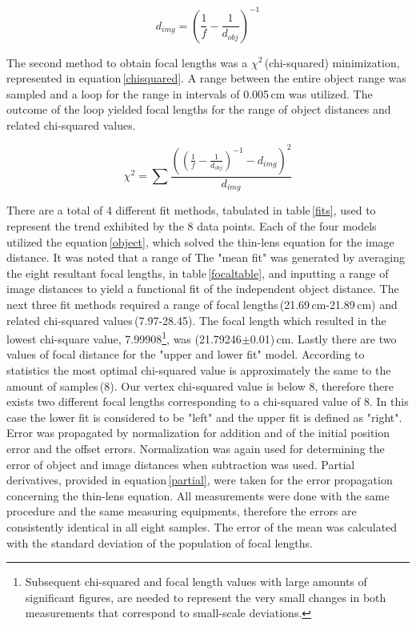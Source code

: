 \documentclass[twocolumn]{aastex6}
\begin{document}
\begin{equation}
d_{img}=\left(\frac{1}{f}-\frac{1}{d_{obj}}\right)^{-1}
\label{object}
\end{equation}

\indent The second method to obtain focal lengths was a $\chi^{2}$\,(chi-squared) minimization, represented in equation\,\ref{chisquared}. A range between the entire object range was sampled and a loop for the range in intervals of 0.005\,cm was utilized. The outcome of the loop yielded focal lengths for the range of object distances and related chi-squared values. 

\begin{equation}
\chi^2 = \sum\frac{\left(\left(\frac{1}{f}-\frac{1}{d_{obj}}\right)^{-1} - d_{img}\right)^2}{d_{img}}
\label{chisquared}
\end{equation}

\indent There are a total of 4 different fit methods, tabulated in table\,\ref{fits}, used to represent the trend exhibited by the 8 data points. Each of the four models utilized the equation\,\ref{object}, which solved the thin-lens equation for the image distance. It was noted that a range of  The "mean fit" was generated by averaging the eight resultant focal lengths, in table\,\ref{focaltable}, and inputting a range of image distances to yield a functional fit of the independent object distance. The next three fit methods required a range of focal lengths\,(21.69\,cm-21.89\,cm) and related chi-squared values\,(7.97-28.45). The focal length which resulted in the lowest chi-square value, 7.99908\footnote{\label{footnote1}Subsequent chi-squared and focal length values with large amounts of significant figures, are needed to represent the very small changes in both measurements that correspond to small-scale deviations.}, was (21.79246$\pm$0.01)\,cm. Lastly there are two values of focal distance for the "upper and lower fit" model. According to statistics the most optimal chi-squared value is approximately the same to the amount of samples\,(8). Our vertex chi-squared value is below 8, therefore there exists two different focal lengths corresponding to a chi-squared value of 8. In this case the lower fit is considered to be "left" and the upper fit is defined as "right".
\\
\indent Error was propagated by normalization for addition and of the initial position error and the offset errors. Normalization was again used for determining the error of object and image distances when subtraction was used. Partial derivatives, provided in equation\,\ref{partial}, were taken for the error propagation concerning the thin-lens equation. All measurements were done with the same procedure and the same measuring equipments, therefore the errors are consistently identical in all eight samples. The error of the mean was calculated with the standard deviation of the population of focal lengths.
\end{document}
